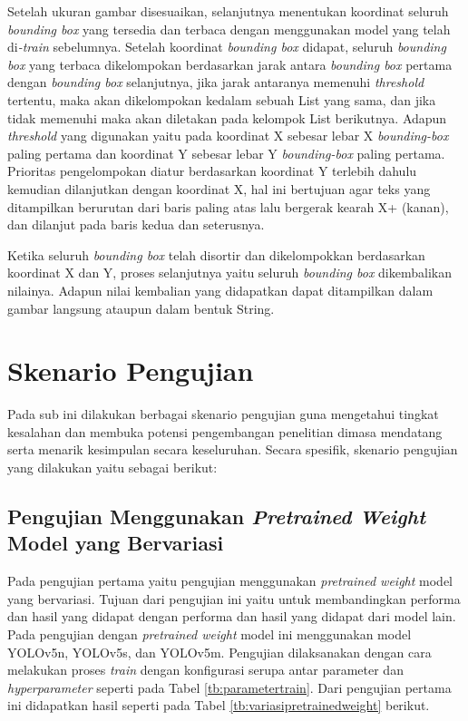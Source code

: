 Setelah ukuran gambar disesuaikan, selanjutnya menentukan koordinat seluruh \textit{bounding box} yang tersedia dan terbaca dengan menggunakan model yang telah di\textit{-train} sebelumnya. Setelah koordinat \textit{bounding box} didapat, seluruh \textit{bounding box} yang terbaca dikelompokan berdasarkan jarak antara \textit{bounding box} pertama dengan \textit{bounding box} selanjutnya, jika jarak antaranya memenuhi \textit{threshold} tertentu, maka akan dikelompokan kedalam sebuah List yang sama, dan jika tidak memenuhi maka akan diletakan pada kelompok List berikutnya. Adapun \textit{threshold} yang digunakan yaitu pada koordinat X sebesar lebar X \textit{bounding-box} paling pertama dan koordinat Y sebesar lebar Y \textit{bounding-box} paling pertama. Prioritas pengelompokan diatur berdasarkan koordinat Y terlebih dahulu kemudian dilanjutkan dengan koordinat X, hal ini bertujuan agar teks yang ditampilkan berurutan dari baris paling atas lalu bergerak kearah X+ (kanan), dan dilanjut pada baris kedua dan seterusnya. \par

Ketika seluruh \textit{bounding box} telah disortir dan dikelompokkan berdasarkan koordinat X dan Y, proses selanjutnya yaitu seluruh \textit{bounding box} dikembalikan nilainya. Adapun nilai kembalian yang didapatkan dapat ditampilkan dalam gambar langsung ataupun dalam bentuk String. 

\section{Skenario Pengujian}
\label{sec:skenariopengujian}

Pada sub ini dilakukan berbagai skenario pengujian guna mengetahui tingkat kesalahan dan membuka potensi pengembangan penelitian dimasa mendatang serta menarik kesimpulan secara keseluruhan. Secara spesifik, skenario pengujian yang dilakukan yaitu sebagai berikut: \par

\subsection{Pengujian Menggunakan \textit{Pretrained Weight} Model yang Bervariasi}
\label{subsec:pengujianpretrainedweight}

Pada pengujian pertama yaitu pengujian menggunakan \textit{pretrained weight} model yang bervariasi. Tujuan dari pengujian ini yaitu untuk membandingkan performa dan hasil yang didapat dengan performa dan hasil yang didapat dari model lain. Pada pengujian dengan \textit{pretrained weight} model ini menggunakan model YOLOv5n, YOLOv5s, dan YOLOv5m. Pengujian dilaksanakan dengan cara melakukan proses \textit{train} dengan konfigurasi serupa antar parameter dan \textit{hyperparameter} seperti pada Tabel \ref*{tb:parametertrain}. Dari pengujian pertama ini didapatkan hasil seperti pada Tabel \ref*{tb:variasipretrainedweight} berikut. \par

